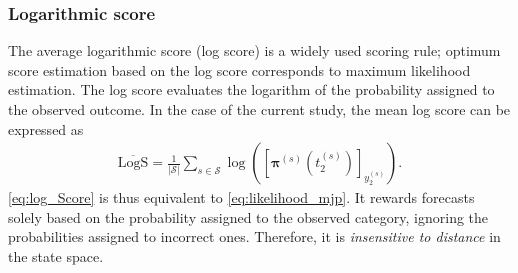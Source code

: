 \documentclass{article}
\begin{document}
\subsubsection{Logarithmic score}
The average logarithmic score (log score) is a widely used scoring rule; optimum score estimation based on the log score corresponds to maximum likelihood estimation. The log score evaluates the logarithm of the probability assigned to the observed outcome. In the case of the current study, the mean log score can be expressed as
\begin{align}
    \overline{\text{LogS}} = \frac{1}{\vert \mathcal{S} \vert} \sum_{s \in \mathcal{S}} \log \left( \left[ \bm{\pi}^{(s)}\left( t_2^{(s)} \right)  \right]_{ y_2^{(s)}} \right).  \label{eq:log_Score}
\end{align}
\cref{eq:log_Score} is thus equivalent to \cref{eq:likelihood_mjp}.
It rewards forecasts solely based on the probability assigned to the observed category, ignoring the probabilities assigned to incorrect ones. Therefore, it is \textit{insensitive to distance} in the state space.  

%
\end{document}
